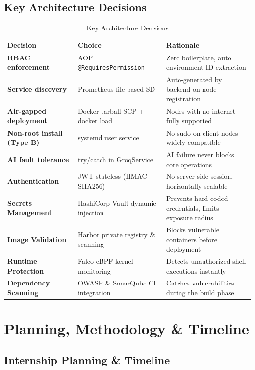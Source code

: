 \documentclass[12pt,a4paper]{report}
\begin{document}
\subsection{Key Architecture Decisions}

\begin{table}[H]
\centering
\renewcommand{\arraystretch}{1.5}
\begin{tabular}{|p{4cm}|p{5cm}|p{5.5cm}|}
\hline
\textbf{Decision} & \textbf{Choice} & \textbf{Rationale} \\
\hline
\textbf{RBAC enforcement} & AOP \texttt{@RequiresPermission} & Zero boilerplate, auto environment ID extraction \\
\hline
\textbf{Service discovery} & Prometheus file-based SD & Auto-generated by backend on node registration \\
\hline
\textbf{Air-gapped deployment} & Docker tarball SCP + docker load & Nodes with no internet fully supported \\
\hline
\textbf{Non-root install (Type B)} & systemd user service & No sudo on client nodes — widely compatible \\
\hline
\textbf{AI fault tolerance} & try/catch in GroqService & AI failure never blocks core operations \\
\hline
\textbf{Authentication} & JWT stateless (HMAC-SHA256) & No server-side session, horizontally scalable \\
\hline
\textbf{Secrets Management} & HashiCorp Vault dynamic injection & Prevents hard-coded credentials, limits exposure radius \\
\hline
\textbf{Image Validation} & Harbor private registry \& scanning & Blocks vulnerable containers before deployment \\
\hline
\textbf{Runtime Protection} & Falco eBPF kernel monitoring & Detects unauthorized shell executions instantly \\
\hline
\textbf{Dependency Scanning} & OWASP \& SonarQube CI integration & Catches vulnerabilities during the build phase \\
\hline
\end{tabular}
\caption{Key Architecture Decisions}
\label{tab:arch_decisions}
\end{table}

\section{Planning, Methodology \& Timeline}

\subsection{Internship Planning \& Timeline}
\end{document}
